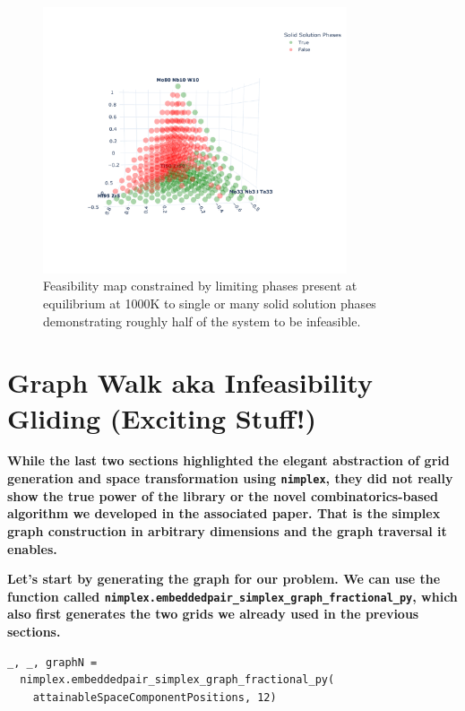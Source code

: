 \begin{figure}[H]
    \centering
    \includegraphics[width=0.8\textwidth]{nimplextutorial2/02.AdditiveManufacturingPathPlanning_28_1.pdf}
    \caption{Feasibility map constrained by limiting phases present at equilibrium at 1000K to single or many solid solution phases demonstrating roughly half of the system to be infeasible.}
    \label{nimplextutorial2:fig:fullfeasibility}
\end{figure}


\section{Graph Walk aka Infeasibility Gliding (Exciting
Stuff!)}\label{nimplextutorial2:graph-walk-aka-infeasibility-gliding-exciting-stuff}

\textbf{While the last two sections highlighted the elegant abstraction
of grid generation and space transformation using
\texttt{nimplex}, they did not really show the true
power of the library or the novel combinatorics-based algorithm we
developed in the associated paper. That is the simplex graph
construction in arbitrary dimensions and the graph traversal it
enables.}

\textbf{Let's start by generating the graph for our problem. We can use
the function called
\texttt{nimplex.embeddedpair\_simplex\_graph\_fractional\_py}, which also first generates the two grids we already used in
the previous sections.}

\begin{verbatim}
_, _, graphN = 
  nimplex.embeddedpair_simplex_graph_fractional_py(
    attainableSpaceComponentPositions, 12)
\end{verbatim}

